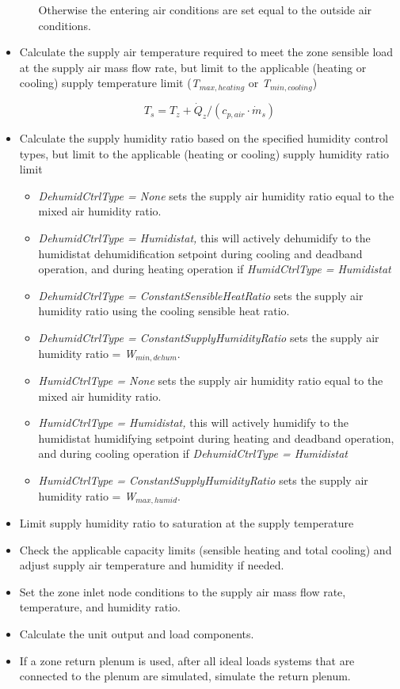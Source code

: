 \begin{itemize}
\begin{itemize}
        Otherwise the entering air conditions are set equal to the outside air conditions.
    \end{itemize}

  \item Calculate the supply air temperature required to meet the zone sensible load at the supply air mass flow rate, but limit to the applicable (heating or cooling) supply temperature limit (\emph{T\(_{max,heating}\)} or \emph{T\(_{min,cooling}\)})

    \begin{equation}
      {T_s} = {T_z} + {\dot Q_z}/({c_{p,air}}\cdot {\dot m_s})
    \end{equation}

  \item Calculate the supply humidity ratio based on the specified humidity control types, but limit to the applicable (heating or cooling) supply humidity ratio limit

    \begin{itemize}
      \item \emph{DehumidCtrlType = None} sets the supply air humidity ratio equal to the mixed air humidity ratio.
      \item \emph{DehumidCtrlType = Humidistat,} this will actively dehumidify to the humidistat dehumidification setpoint during cooling and deadband operation, and during heating operation if \emph{HumidCtrlType = Humidistat}
      \item \emph{DehumidCtrlType = ConstantSensibleHeatRatio} sets the supply air humidity ratio using the cooling sensible heat ratio.
      \item \emph{DehumidCtrlType = ConstantSupplyHumidityRatio} sets the supply air humidity ratio = \emph{W\(_{min,dehum}\)}.
      \item \emph{HumidCtrlType = None} sets the supply air humidity ratio equal to the mixed air humidity ratio.
      \item \emph{HumidCtrlType = Humidistat,} this will actively humidify to the humidistat humidifying setpoint during heating and deadband operation, and during cooling operation if \emph{DehumidCtrlType = Humidistat}
      \item \emph{HumidCtrlType = ConstantSupplyHumidityRatio} sets the supply air humidity ratio = \emph{W\(_{max,humid}\)}.
    \end{itemize}

  \item Limit supply humidity ratio to saturation at the supply temperature
  \item Check the applicable capacity limits (sensible heating and total cooling) and adjust supply air temperature and humidity if needed.
  \item Set the zone inlet node conditions to the supply air mass flow rate, temperature, and humidity ratio.
  \item Calculate the unit output and load components.
  \item If a zone return plenum is used, after all ideal loads systems that are connected to the plenum are simulated, simulate the return plenum.
\end{itemize}

